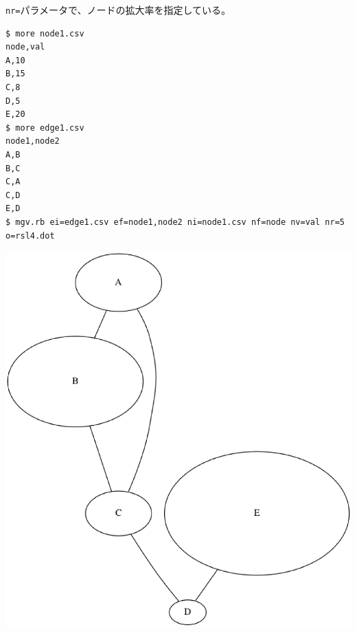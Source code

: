 \verb|nr=|パラメータで、ノードの拡大率を指定している。


\begin{Verbatim}[baselinestretch=0.7,frame=single]
$ more node1.csv
node,val
A,10
B,15
C,8
D,5
E,20
$ more edge1.csv
node1,node2
A,B
B,C
C,A
C,D
E,D
$ mgv.rb ei=edge1.csv ef=node1,node2 ni=node1.csv nf=node nv=val nr=5 o=rsl4.dot
\end{Verbatim}
\begin{minipage}{1.0\hsize}
\begin{center}
\includegraphics[scale=0.3]{figure/mgv4.eps}
\end{center}
\end{minipage}
